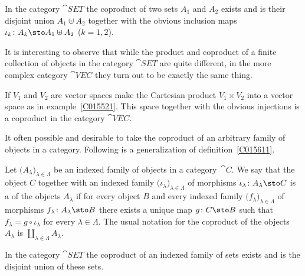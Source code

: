 \begin{exam}\label{C015617} In the category $\cat{SET}$ the
coproduct of two sets $A_1$ and $A_2$ exists and is their disjoint union $A_1 \uplus A_2$
together with the obvious inclusion maps $\iota_k\colon A_k  \sto A_1 \uplus A_2$ ($k = 1,2$).
\end{exam}

It is interesting to observe that while the product and coproduct of a finite collection
of objects in the category $\cat{SET}$ are quite different, in the more complex category
$\cat{VEC}$ they turn out to be exactly the same thing.

\begin{exam} If $V_1$ and $V_2$ are vector spaces make the Cartesian product $V_1 \times V_2$
into a vector space as in example~\ref{C015521}. This space together with the obvious
injections is a
coproduct in the category $\cat{VEC}$.
\end{exam}

It often possible and desirable to take the coproduct of an arbitrary family of objects
in a category.  Following is a generalization of definition~\ref{C015611}.

\begin{defn}\label{C015624} Let $\bigl(A_\lambda\bigr)_{\lambda \in \Lambda}$ be an indexed
family of objects in a category~$\cat C$. We say that the object $C$ together with an
indexed family $\bigl(\iota_\lambda\bigr)_{\lambda \in \Lambda}$ of morphisms
$\iota_\lambda\colon A_\lambda \sto C$ is a
 of the objects $A_\lambda$ if for every object $B$ and every indexed
family $\bigl(f_\lambda\bigr)_{\lambda \in \Lambda}$ of morphisms $f_\lambda\colon
A_\lambda \sto B$ there exists a unique map $g \colon C \sto B$ such that $f_\lambda = g
\circ \iota_\lambda$ for every $\lambda \in \Lambda$.  The usual notation for the
coproduct of the objects $A_\lambda$ is
$\coprod_{\lambda \in \Lambda} A_\lambda$.
\end{defn}

\begin{exam} In the category $\cat{SET}$ the
coproduct of an indexed family of sets exists and is the disjoint union of these sets.
\end{exam}

